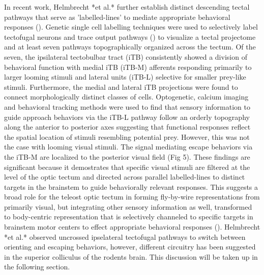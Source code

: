 \documentclass{ar-1col}
\begin{document}
{In recent work, Helmbrecht *et al.* further establish distinct descending tectal pathways that serve as 'labelled-lines' to mediate appropriate behavioral responses (\cite{helmbrecht2018topography}). Genetic single cell labelling techniques were used to selectively label tectofugal neurons and trace output pathways (\cite{scott2007targeting}) to visualize a tectal projectome and at least seven pathways topographically organized across the tectum. Of the seven, the ipsilateral tectobulbar tract (iTB) consistently showed a division of behavioral function with medial iTB (iTB-M) afferents responding primarily to larger looming stimuli and lateral units (iTB-L) selective for smaller prey-like stimuli. Furthermore, the medial and lateral iTB projections were found to connect morphologically distinct classes of cells. Optogenetic, calcium imaging and behavioral tracking methods were used to find that sensory information to guide approach behaviors via the iTB-L pathway follow an orderly topography along the anterior to posterior axes suggesting that functional responses reflect the spatial location of stimuli resembling potential prey. However, this was not the case with looming visual stimuli. The signal mediating escape behaviors via the iTB-M are localized to the posterior visual field (Fig 5). These findings are significant because it demostrates that specific visual stimuli are filtered at the level of the optic tectum and directed across parallel labelled-lines to distinct targets in the brainstem to guide behaviorally relevant responses. This suggests a broad role for the teleost optic tectum in forming fly-by-wire representations from primarily visual, but integrating other sensory information as well, transformed to body-centric representation that is selectively channeled to specific targets in brainstem motor centers to effect appropriate behavioral responses (\cite{northmore2011optic}). Helmbrecht *et al.* observed uncrossed ipselateral tectofugal pathways to switch between orienting and escaping behaviors, however, different circuitry has been suggested in the superior colliculus of the rodents brain. This discussion will be taken up in the following section.

}
\end{document}
